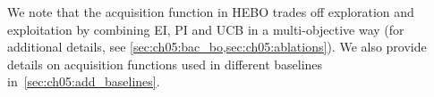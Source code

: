 
We note that the acquisition function in HEBO trades off exploration and exploitation by combining EI, PI and UCB in a multi-objective way (for additional details, see \cref{sec:ch05:bac_bo,sec:ch05:ablations}).
We also provide details on acquisition functions used in different baselines in~\cref{sec:ch05:add_baselines}.

